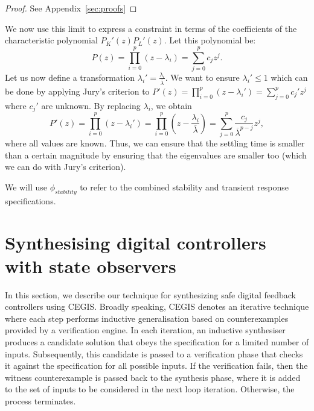 \documentclass[sigconf]{llncs}
\begin{document}
\begin{proof}
See Appendix~\ref{sec:proofs}
\end{proof}
%
We now use this limit to express a constraint in terms of the
coefficients of the characteristic polynomial $P_K'(z)P_L'(z)$.
Let this polynomial be:
%
\begin{equation}
P(z)=\prod_{i=0}^p (z-\lambda_i)=\sum_{j=0}^p c_jz^j.
\end{equation}
%
Let us now define a
transformation $\lambda_i'=\frac{\lambda_i}{\overline{\lambda}}$.  We want
to ensure $\lambda_i' \leq 1$ which can be done by applying Jury's criterion
to $P'(z)=\prod_{i=0}^p (z-\lambda_i')=\sum_{j=0}^p c_j'z^j$ where $c_j'$ are
unknown.  By replacing $\lambda_i$, we obtain
%
\begin{equation}
P'(z)=\prod_{i=0}^p (z-\lambda_i')=\prod_{i=0}^p \left(z-\frac{\lambda_i}{\overline{\lambda}}\right)=\sum_{j=0}^p \frac{c_j}{\overline{\lambda}^{p-j}}z^j, 
\end{equation}
%
where all values are known. Thus, we can ensure that the settling time is smaller than
a certain magnitude by ensuring that 
the eigenvalues are smaller too (which we can do with Jury's criterion).

We will use $\phi_{stability}$ to refer to the combined stability and transient response specifications.

\section{Synthesising digital controllers with state observers}\label{sec:dynamic_synth}


In this section, we describe our technique for synthesizing safe
digital feedback controllers using CEGIS. Broadly speaking, CEGIS
denotes an iterative technique where each step performs inductive
generalisation based on counterexamples provided by a verification
engine. In each iteration, an inductive synthesiser produces a
candidate solution that obeys the specification for a limited number
of inputs. Subsequently, this candidate is passed to a verification
phase that checks it against the specification for all possible
inputs. If the verification fails, then the witness counterexample is
passed back to the synthesis phase, where it is added to the set of
inputs to be considered in the next loop iteration. Otherwise, the process terminates.
\end{document}
